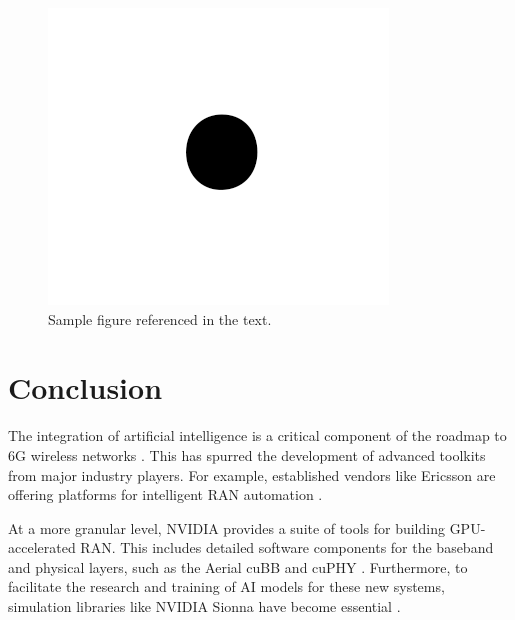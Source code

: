 \documentclass[conference]{IEEEtran}
\begin{document}
\begin{figure}[htbp]
\centerline{\includegraphics{fig1.png}}
\caption{Sample figure referenced in the text.}
\label{fig}
\end{figure}

\section{Conclusion}
The integration of artificial intelligence is a critical component of the roadmap to 6G wireless networks \cite{letaief_roadmap_2019}. This has spurred the development of advanced toolkits from major industry players. For example, established vendors like Ericsson are offering platforms for intelligent RAN automation \cite{ericsson_iran_2025}.

At a more granular level, NVIDIA provides a suite of tools for building GPU-accelerated RAN. This includes detailed software components for the baseband and physical layers, such as the Aerial cuBB and cuPHY \cite{nvidia_cubb_quickstart_2025, nvidia_cuphy_overview_2025}. Furthermore, to facilitate the research and training of AI models for these new systems, simulation libraries like NVIDIA Sionna have become essential \cite{nvidia_sionna_2025}.

{\color{blue}


}
\end{document}
